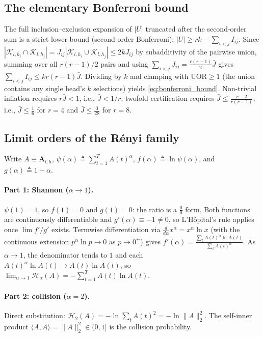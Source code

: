 \documentclass[final,5p,times,twocolumn]{elsarticle}
\theoremstyle{definition}
\theoremstyle{remark}
\newcommand{\Attn}[2]{\mathbf{A}_{#1,#2}}
\newcommand{\Renyi}[2]{\mathcal{H}_{#1}\!\left(#2\right)}
\newcommand{\UOR}{\mathrm{UOR}}
\newcommand{\TokSet}[1]{\mathcal{K}_{l,#1}}
\begin{document}
\subsection{The elementary Bonferroni bound}
\label{app:bonferroni}

The full inclusion--exclusion expansion of $|U|$ truncated after the
second-order sum is a strict lower bound (second-order Bonferroni):
 $|U| \ge rk - \sum_{i<j}I_{ij}$. Since
 $|\TokSet{h_i}\cap\TokSet{h_j}| = J_{ij}
|\TokSet{h_i}\cup\TokSet{h_j}| \le 2kJ_{ij}$ by subadditivity of the
pairwise union, summing over all $r(r-1)/2$ pairs and using
 $\sum_{i<j}J_{ij} = \frac{r(r-1)}{2}\bar J$ gives
 $\sum_{i<j}I_{ij} \le kr(r-1)\bar J$. Dividing by $k$ and clamping with
 $\UOR \ge 1$ (the union contains any single head's $k$ selections)
yields \cref{eq:bonferroni_bound}. Non-trivial inflation requires
 $r\bar J < 1$, i.e., $\bar J < 1/r$; twofold certification requires
 $\bar J \le \frac{r-2}{r(r-1)}$, i.e., $\bar J \le \frac16$ for $r=4$ and $\bar J \le \frac{3}{28}$ for $r=8$.

\subsection{Limit orders of the R\'enyi family}
\label{app:renyi}

Write $A \equiv \Attn{l}{h}$, $\psi(\alpha) \triangleq \sum_{t=1}^T
A(t)^{\alpha}$, $f(\alpha) \triangleq \ln\psi(\alpha)$, and
 $g(\alpha) \triangleq 1-\alpha$.

\paragraph{Part 1: Shannon ($\alpha \to 1$).}
 $\psi(1) = 1$, so $f(1) = 0$ and $g(1) = 0$: the ratio is a
 $\frac00$ form. Both functions are continuously differentiable and
 $g'(\alpha) \equiv -1 \neq 0$, so L'H\^opital's rule applies once
 $\lim f'/g'$ exists. Termwise differentiation via
 $\frac{d}{d\alpha}x^{\alpha} = x^{\alpha}\ln x$ (with the continuous
extension $p^{\alpha}\ln p \to 0$ as $p \to 0^{+}$) gives
 $f'(\alpha) = \frac{\sum_{t} A(t)^{\alpha}\ln A(t)}
{\sum_{t} A(t)^{\alpha}}$. As $\alpha \to 1$, the denominator tends to
 $1$ and each $A(t)^{\alpha}\ln A(t) \to A(t)\ln A(t)$, so
 $\lim_{\alpha\to1}\Renyi{\alpha}{A} = -\sum_{t=1}^{T} A(t)\ln A(t)$.

\paragraph{Part 2: collision ($\alpha = 2$).}
Direct substitution:
 $\Renyi{2}{A} = -\ln\sum_t A(t)^2 = -\ln\|A\|_2^2$. The self-inner
product $\langle A, A\rangle = \|A\|_2^2 \in (0,1]$ is the collision
probability.
\end{document}
